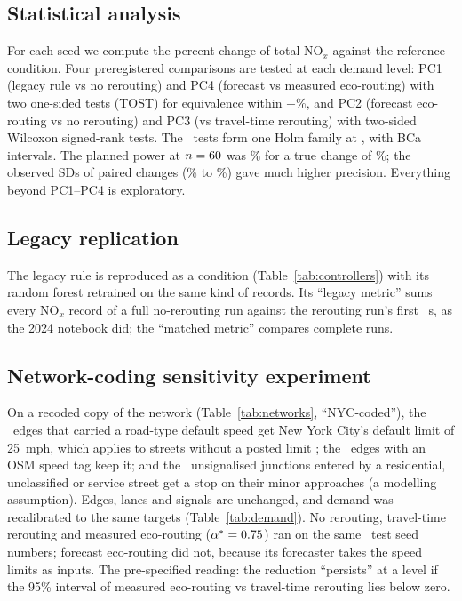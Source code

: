 \documentclass[conference]{IEEEtran}
\begin{document}
\begin{table}[t]
\centering\footnotesize
\caption{Experiments and Seed Sets}
\label{tab:design}

\end{table}

\subsection{Statistical analysis}
For each seed we compute the percent change of total NO$_x$ against the reference condition. Four preregistered
comparisons are tested at each demand level: PC1 (legacy rule vs no rerouting) and PC4 (forecast vs measured
eco-routing) with two one-sided tests (TOST) for equivalence within $\pm$\SESOI\%, and PC2 (forecast eco-routing vs no
rerouting) and PC3 (vs travel-time rerouting) with two-sided Wilcoxon signed-rank tests. The \TestsInFamily\ tests
form one Holm family at \FamilywiseAlpha, with BCa intervals. The planned power at $n = 60$ was
\PowerAtNSup\% for a true change of \SESOI\%; the observed SDs of paired changes (\ObservedSDMin\% to
\ObservedSDMax\%) gave much higher precision. Everything beyond PC1--PC4 is exploratory.

\subsection{Legacy replication}
The legacy rule is reproduced as a condition (Table~\ref{tab:controllers}) with its random forest retrained on the
same kind of records. Its ``legacy metric'' sums every NO$_x$ record of a full no-rerouting run against the rerouting
run's first \LegacyControlledSteps~s, as the 2024 notebook did; the ``matched metric'' compares complete runs.

\subsection{Network-coding sensitivity experiment}\label{sec:sensdesign}
On a recoded copy of the network (Table~\ref{tab:networks}, ``NYC-coded''), the \SensEdgesSpeedChanged\ edges that
carried a road-type default speed get New York City's default limit of 25~mph, which applies to streets without a
posted limit \cite{nycdot2014speed}; the \SensEdgesTagged\ edges with an OSM speed tag keep it; and the
\SensJunctionsStop\ unsignalised junctions entered by a residential, unclassified or service street get a stop on
their minor approaches (a modelling assumption). Edges, lanes and signals are unchanged, and demand was recalibrated
to the same targets (Table~\ref{tab:demand}). No rerouting, travel-time rerouting and measured eco-routing ($\alpha^* =
0.75$) ran on the same \ConfirmatoryN\ test seed numbers; forecast eco-routing did not, because its
forecaster takes the speed limits as inputs. The pre-specified reading: the reduction ``persists'' at a level if the
95\% interval of measured eco-routing vs travel-time rerouting lies below zero.
\end{document}
